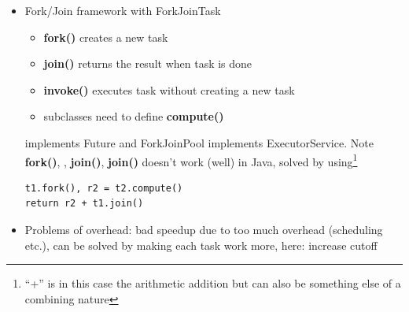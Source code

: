 \documentclass[a4paper]{article}
\begin{document}
\begin{itemize}
\item Fork/Join framework with ForkJoinTask 
\begin{itemize}
\item \textbf{fork()} creates a new task
\item \textbf{join()} returns the result when task is done
\item \textbf{invoke()} executes task without creating a new task
\item subclasses need to define \textbf{compute()}
\end{itemize}
implements Future and ForkJoinPool implements ExecutorService. Note \textbf{fork()}, , \textbf{join()}, \textbf{join()} doesn’t work (well) in Java, solved by using\footnote{``+'' is in this case the arithmetic addition but can also be something else of a combining nature}
\begin{lstlisting}
t1.fork(), r2 = t2.compute()
return r2 + t1.join()
\end{lstlisting}
\item Problems of overhead: bad speedup due to too much overhead (scheduling etc.), can be solved by making each task work more, here: increase cutoff
\end{itemize}
\end{document}
